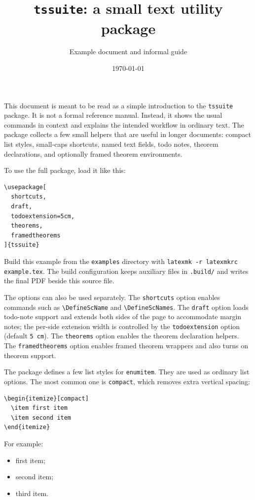 \documentclass[a4paper,11pt]{article}
\title{\texttt{tssuite}: a small text utility package}
\author{Example document and informal guide}
\date{\today}
\newcommand{\pkg}[1]{\texttt{#1}}
\begin{document}
\maketitle

This document is meant to be read as a simple introduction to the
\pkg{tssuite} package.  It is not a formal reference manual.  Instead, it shows
the usual commands in context and explains the intended workflow in ordinary
text.  The package collects a few small helpers that are useful in longer
documents: compact list styles, small-caps shortcuts, named text fields, todo
notes, theorem declarations, and optionally framed theorem environments.

To use the full package, load it like this:

\begin{verbatim}
\usepackage[
  shortcuts,
  draft,
  todoextension=5cm,
  theorems,
  framedtheorems
]{tssuite}
\end{verbatim}

Build this example from the \texttt{examples} directory with
\texttt{latexmk -r latexmkrc example.tex}.  The build configuration keeps
auxiliary files in \texttt{.build/} and writes the final PDF beside this source
file.

The options can also be used separately.  The \verb|shortcuts| option enables
commands such as \verb|\DefineScName| and \verb|\DefineScNames|.  The
\verb|draft| option loads todo-note support and extends both sides of the page
to accommodate margin notes; the per-side extension width is controlled by the
\verb|todoextension| option (default \texttt{5\,cm}).  The \verb|theorems|
option enables the theorem declaration helpers.  The \verb|framedtheorems|
option enables framed theorem wrappers and also turns on theorem support.

The package defines a few list styles for \pkg{enumitem}.  They are used as
ordinary list options.  The most common one is \verb|compact|, which removes
extra vertical spacing:

\begin{verbatim}
\begin{itemize}[compact]
  \item first item
  \item second item
\end{itemize}
\end{verbatim}

For example:

\begin{itemize}[compact]
  \item first item;
  \item second item;
  \item third item.
\end{itemize}
\end{document}
